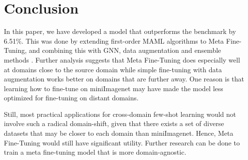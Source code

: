\documentclass[10pt,twocolumn,letterpaper]{article}
\begin{document}
\section{Conclusion}

In this paper, we have developed a model that outperforms the benchmark by 6.51\%. This was done by extending first-order MAML algorithms to Meta Fine-Tuning, and combining this with GNN, data augmentation and ensemble methods . Further analysis suggests that Meta Fine-Tuning does especially well at domains close to the source domain while simple fine-tuning with data augmentation works better on domains that are further away. One reason is that learning how to fine-tune on miniImagenet may have made the model less optimized for fine-tuning on distant domains.

Still, most practical applications for cross-domain few-shot learning would not involve such a radical domain-shift, given that there exists a set of diverse datasets that may be closer to each domain than miniImagenet. Hence, Meta Fine-Tuning would still have significant utility. Further research can be done to train a meta fine-tuning model that is more domain-agnostic.

{\small


}
\end{document}
